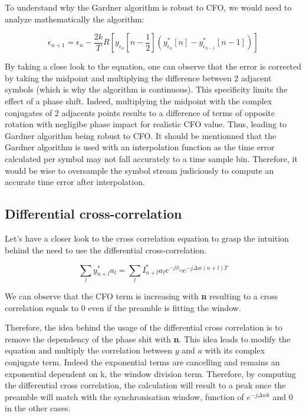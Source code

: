 To understand why the Gardner algorithm is robust to CFO, we would need to analyze mathematically the algorithm:

\begin{equation*}
    \epsilon_{n+1} = \epsilon_{n} - \frac{2k}{T} R[y_{\epsilon_{n}}[n-\frac{1}{2}](y_{\epsilon_{n}}^{*}[n] - y_{\epsilon_{n-1}}^{*}[n-1])]
\end{equation*}

By taking a close look to the equation, one can observe that the error is corrected by taking the midpoint and multiplying the difference between 2 adjacent symbols (which is why the algorithm is
continuous). This specificity limits the effect of a phase shift.  Indeed, multiplying the midpoint with the complex conjugates of 2 adjacents points results to 
a difference of terms of opposite rotation with negligibe phase impact for realistic CFO value.  Thus, leading to Gardner algorithm being robust to CFO.\newline
It should be mentionned that the Gardner algorithm is used with an interpolation function as the time error calculated per symbol 
may not fall accurately to a time sample bin.  Therefore, it would be wise to oversample the symbol stream judiciously to compute an 
accurate time error after interpolation.

\subsection{Differential cross-correlation}

Let's have a closer look to the cross correlation equation to grasp the intuition behind the need to use the differential cross-correlation.

\begin{equation*}
    \sum_{l}{y^{*}_{n+l}a_{l}} = \sum_{l}{I^{*}_{n+l}a_{l}e^{-j\phi_{o}}e^{-j\Delta w(n+l)T}}
\end{equation*}

We can observe that the CFO term is increasing with \textbf{n} resulting to a cross correlation equals to 0 even if the preamble is fitting
the window.

Therefore, the idea behind the usage of the differential cross correlation is to remove the dependency of the phase shit with \textbf{n}.
This idea leads to modify the equation and multiply the correlation between $y$ and $a$ with its complex conjugate term. Indeed the exponential 
terms are cancelling and remains an exponential dependent on k, the window division term.
Therefore, by computing the differential cross correlation, the calculation will result to a peak once the preamble will match with the synchronisation
 window, function of $e^{-j\Delta wk}$ and 0 in the other cases.
 

